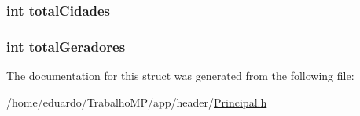 \hypertarget{structrelatorio_a3648fada6905f25d99068e9a20cd5530}{
\subsubsection[{total\-Cidades}]{\setlength{\rightskip}{0pt plus 5cm}int total\-Cidades}}\label{structrelatorio_a3648fada6905f25d99068e9a20cd5530}
\hypertarget{structrelatorio_ae0aaf407daf7bcb7b0926e07d8752de8}{
\subsubsection[{total\-Geradores}]{\setlength{\rightskip}{0pt plus 5cm}int total\-Geradores}}\label{structrelatorio_ae0aaf407daf7bcb7b0926e07d8752de8}


The documentation for this struct was generated from the following file\-:\begin{DoxyCompactItemize}
\item 
/home/eduardo/\-Trabalho\-M\-P/app/header/\hyperlink{_principal_8h}{Principal.\-h}\end{DoxyCompactItemize}
